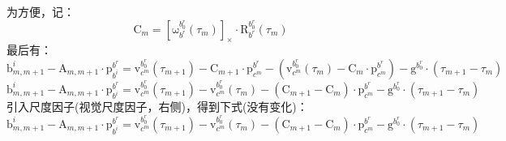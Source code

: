 \documentclass[12pt, onecolumn]{article}
\newcommand\liehat[1]{\left[ #1 \right]_\times}
\newcommand\bsm[1]{\boldsymbol{\mathrm{#1}}}
\newcommand\rotation[2]{{\bsm{R}_{#1}^{#2}}}
\newcommand\angvel[2]{{\bsm{\omega}_{#1}^{#2}}}
\newcommand\translation[2]{{\bsm{p}_{#1}^{#2}}}
\newcommand\linvel[2]{{\bsm{v}_{#1}^{#2}}}
\newcommand\gravity[1]{{\bsm{g}^{#1}}}
\begin{document}
	为方便，记：
	\begin{equation}
	\bsm{C}_m=\liehat{\angvel{b^r}{b^r_0}(\tau_m)}\cdot\rotation{b^r}{b^r_0}(\tau_m)
	\end{equation}
	最后有：
	\begin{equation}
	\bsm{b}^i_{m,m+1}-\bsm{A}_{m,m+1}\cdot\translation{b^i}{b^r}=
	\linvel{c^m}{b^r_0}(\tau_{m+1})-\bsm{C}_{m+1}\cdot\translation{c^m}{b^r}
	-\left(\linvel{c^m}{b^r_0}(\tau_{m})-\bsm{C}_{m}\cdot\translation{c^m}{b^r} \right) -\gravity{b^r_0}\cdot\left(\tau_{m+1}-\tau_m \right) 
	\end{equation}
	\begin{equation}
	\bsm{b}^i_{m,m+1}-\bsm{A}_{m,m+1}\cdot\translation{b^i}{b^r}=
	\linvel{c^m}{b^r_0}(\tau_{m+1})-\linvel{c^m}{b^r_0}(\tau_{m})
	-\left( \bsm{C}_{m+1}-\bsm{C}_{m}\right) \cdot\translation{c^m}{b^r}
	-\gravity{b^r_0}\cdot\left(\tau_{m+1}-\tau_m \right) 
	\end{equation}
	引入尺度因子(视觉尺度因子，右侧)，得到下式(没有变化)：
	\begin{equation}
	\bsm{b}^i_{m,m+1}-\bsm{A}_{m,m+1}\cdot\translation{b^i}{b^r}=
	\linvel{c^m}{b^r_0}(\tau_{m+1})-\linvel{c^m}{b^r_0}(\tau_{m})
	-\left( \bsm{C}_{m+1}-\bsm{C}_{m}\right) \cdot\translation{c^m}{b^r}
	-\gravity{b^r_0}\cdot\left(\tau_{m+1}-\tau_m \right) 
	\end{equation}
	
\end{document}
